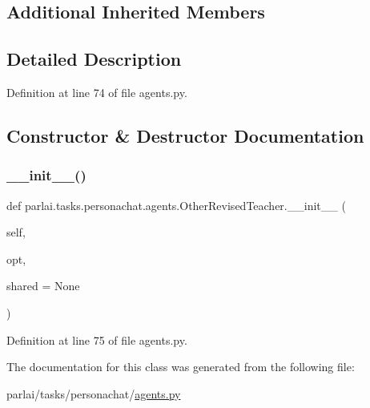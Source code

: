 \subsection*{Additional Inherited Members}


\subsection{Detailed Description}


Definition at line 74 of file agents.\+py.



\subsection{Constructor \& Destructor Documentation}
\mbox{\label{classparlai_1_1tasks_1_1personachat_1_1agents_1_1OtherRevisedTeacher_abb68640d48b19dae6529fb4e90decf78}} 
\subsubsection{\texorpdfstring{\+\_\+\+\_\+init\+\_\+\+\_\+()}{\_\_init\_\_()}}
{\footnotesize\ttfamily def parlai.\+tasks.\+personachat.\+agents.\+Other\+Revised\+Teacher.\+\_\+\+\_\+init\+\_\+\+\_\+ (\begin{DoxyParamCaption}\item[{}]{self,  }\item[{}]{opt,  }\item[{}]{shared = {\ttfamily None} }\end{DoxyParamCaption})}



Definition at line 75 of file agents.\+py.



The documentation for this class was generated from the following file\+:\begin{DoxyCompactItemize}
\item 
parlai/tasks/personachat/\hyperlink{parlai_2tasks_2personachat_2agents_8py}{agents.\+py}\end{DoxyCompactItemize}
